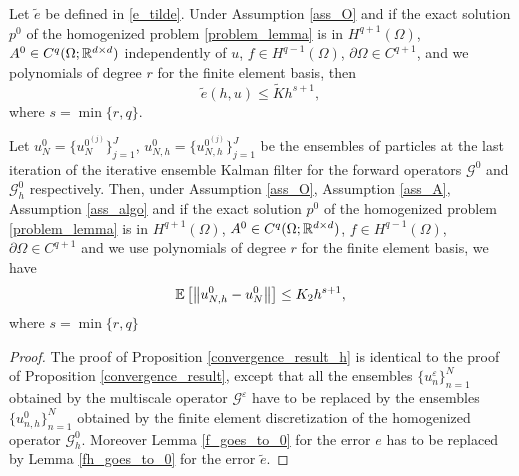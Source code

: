 \documentclass[10pt]{article}
\begin{document}
\begin{lemma}
	\label{fh_goes_to_0}
	Let $\tilde{e}$ be defined in \eqref{e_tilde}. Under Assumption \ref{ass_O} and if the exact solution $p^0$ of the homogenized problem \eqref{problem_lemma} is in $H^{q+1}(\Omega)$, $A^0 \in C^q(\Omega;\mathbb{R}^{d \times d})$ independently of $u$, $f \in H^{q-1}(\Omega)$, $\partial \Omega \in C^{q+1}$, and we  polynomials of degree $r$ for the finite element basis, then 
	\[ \tilde{e}(h, u) \le \tilde{K} h^{s+1}, \]
	where $s = \min \{ r, q \}$.
\end{lemma}
\begin{proposition}
\label{convergence_result_h}
Let $u_{N}^0 = \{ u_{N}^{0^{(j)}} \}_{j=1}^J$, $u_{N,h}^0 = \{ u_{N,h}^{0^{(j)}} \}_{j=1}^J$ be the ensembles of particles at the last iteration of the iterative ensemble Kalman filter for the forward operators $\mathcal{G}^0$ and $\mathcal{G}_h^0$ respectively. Then, under Assumption \ref{ass_O}, Assumption \ref{ass_A}, Assumption \ref{ass_algo} and if the exact solution $p^0$ of the homogenized problem \eqref{problem_lemma} is in $H^{q+1}(\Omega)$, $A^0 \in C^q(\Omega;\mathbb{R}^{d \times d})$, $f \in H^{q-1}(\Omega)$, $\partial \Omega \in C^{q+1}$ and we use polynomials of degree $r$ for the finite element basis, we have
\[ \mathbb{E} \left [ \left\|u_{N,h}^0 - u_N^0\right\| \right ] \le K_2 h^{s+1}, \]
where $s = \min \{ r, q \}$ 
\end{proposition}
\begin{proof}
The proof of Proposition \ref{convergence_result_h} is identical to the proof of Proposition \ref{convergence_result}, except that all the ensembles $\{ u_n^{\varepsilon} \}_{n=1}^N$ obtained by the multiscale operator $\mathcal{G}^{\varepsilon}$ have to be replaced by the ensembles $\{ u_{n,h}^0 \}_{n=1}^N$ obtained by the finite element discretization of the homogenized operator $\mathcal{G}^0_h$. Moreover Lemma \ref{f_goes_to_0} for the error $e$ has to be replaced by Lemma \ref{fh_goes_to_0} for the error $\tilde{e}$.
\end{proof}
\end{document}
